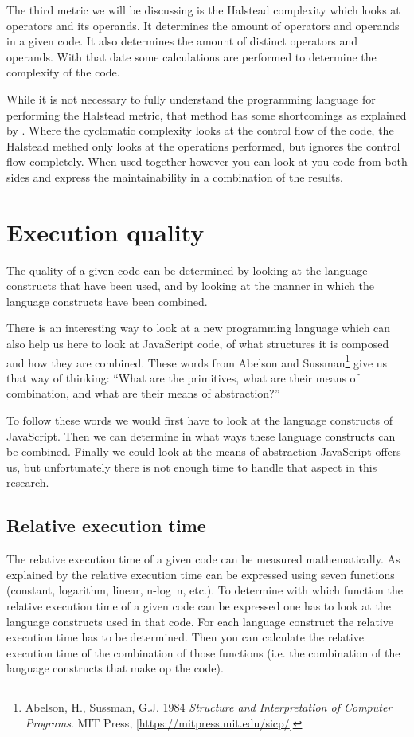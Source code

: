 The third metric we will be discussing is the Halstead complexity which looks
at operators and its operands. It determines the amount of operators and
operands in a given code. It also determines the amount of distinct operators
and operands. With that date some calculations are performed to determine the
complexity of the code.

While it is not necessary to fully understand the programming language for
performing the Halstead metric, that method has some shortcomings as explained
by \citet{yu2010survey}. Where the cyclomatic complexity looks at the control
flow of the code, the Halstead methed only looks at the operations performed,
but ignores the control flow completely. When used together however you can look at you code from both sides and express the maintainability in a combination of the results.

\section{Execution quality}

The quality of a given code can be determined by looking at the language constructs
that have been used, and by looking at the manner in which the language constructs
have been combined.

There is an interesting way to look at a new programming language which can
also help us here to look at JavaScript code, of what structures it is composed
and how they are combined. These words from Abelson and
Sussman\footnote{Abelson, H., Sussman, G.J. 1984 {\em Structure and
Interpretation of Computer Programs}. MIT Press,
[\url{https://mitpress.mit.edu/sicp/}]} give us that way of thinking: ``What
are the primitives, what are their means of combination, and what are their
means of abstraction?''

To follow these words we would first have to look at the language constructs of
JavaScript. Then we can determine in what ways these language constructs can be
combined. Finally we could look at the means of abstraction JavaScript offers
us, but unfortunately there is not enough time to handle that aspect in this
research.

\subsection{Relative execution time}

The relative execution time of a given code can be measured mathematically. As
explained by \citet[Chapter 4]{goodrich2008data} the relative execution time
can be expressed using seven functions (constant, logarithm, linear, n-log~n,
etc.). To determine with which function the relative execution time of a given
code can be expressed one has to look at the language constructs used in that
code. For each language construct the relative execution time has to be
determined. Then you can calculate the relative execution time of the
combination of those functions (i.e. the combination of the language constructs
that make op the code).

